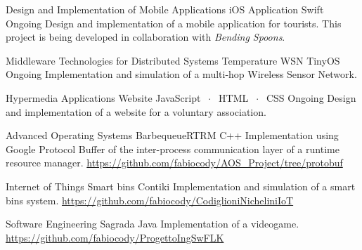 

\begin{cventries}

\cventry
    {Design and Implementation of Mobile Applications}
    {iOS Application}
    {Swift}
    {Ongoing}
    {Design and implementation of a mobile application for tourists. This project is being developed in collaboration with \textit{Bending Spoons}.}
    
\cventry
    {Middleware Technologies for Distributed Systems}
    {Temperature WSN}
    {TinyOS}
    {Ongoing}
    {Implementation and simulation of a multi-hop Wireless Sensor Network.}
    
\cventry
    {Hypermedia Applications}
    {Website}
    {JavaScript $\;\cdot\;$ HTML $\;\cdot\;$ CSS}
    {Ongoing}
    {Design and implementation of a website for a voluntary association.}

\iffalse
\cventry
    {Recommender System}
    {Kaggle competition}
    {Python}
    {}
    {Design and implementation of a system able to recommend relevant items to users of an e-commerce website. \href{https://github.com/Alenichel/CodiglioniNichelini\_recsys-polimi-2019}{https://github.com/Alenichel/CodiglioniNichelini\_recsys-polimi-2019}}
\fi
    
\cventry
    {Advanced Operating Systems}
    {BarbequeueRTRM}
    {C++}
    {}
    {Implementation using Google Protocol Buffer of the inter-process communication layer of a runtime resource manager. \href{https://github.com/fabiocody/AOS\_Project/tree/protobuf}{https://github.com/fabiocody/AOS\_Project/tree/protobuf}}
    
\cventry
    {Internet of Things}
    {Smart bins}
    {Contiki}
    {}
    {Implementation and simulation of a smart bins system. \qquad\qquad\qquad\qquad\qquad\qquad\qquad\qquad \href{https://github.com/fabiocody/CodiglioniNicheliniIoT}{https://github.com/fabiocody/CodiglioniNicheliniIoT}}
    
\cventry
    {Software Engineering}
    {Sagrada}
    {Java}
    {}
    {Implementation of a videogame. \qquad\qquad\qquad\qquad\qquad\qquad\qquad\qquad\qquad\qquad\qquad\qquad\qquad \href{https://github.com/fabiocody/ProgettoIngSwFLK}{https://github.com/fabiocody/ProgettoIngSwFLK}}
\end{cventries}
